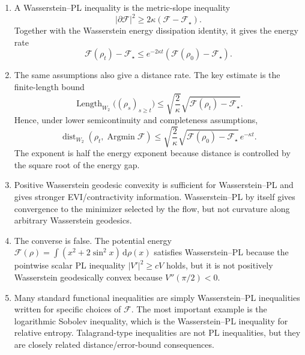 \documentclass[11pt]{article}
\theoremstyle{definition}
\newcommand{\F}{\mathcal F}
\newcommand{\W}{W_2}
\newcommand{\dd}{\,\mathrm d}
\newcommand{\distW}{\operatorname{dist}_{\W}}
\begin{document}
\begin{enumerate}[label=(\roman*)]
\item A Wasserstein--PL inequality is the metric-slope inequality
\[
        |\partial\F|^2\ge 2\kappa(\F-\F_\star).
\]
Together with the Wasserstein energy dissipation identity, it gives the energy rate
\[
        \F(\rho_t)-\F_\star\le e^{-2\kappa t}(\F(\rho_0)-\F_\star).
\]

\item The same assumptions also give a distance rate. The key estimate is the finite-length bound
\[
        \operatorname{Length}_{\W}\bigl((\rho_s)_{s\ge t}\bigr)
        \le \sqrt{\frac{2}{\kappa}}
        \sqrt{\F(\rho_t)-\F_\star}.
\]
Hence, under lower semicontinuity and completeness assumptions,
\[
        \distW(\rho_t,\operatorname{Argmin}\F)
        \le
        \sqrt{\frac{2}{\kappa}}
        \sqrt{\F(\rho_0)-\F_\star}\,e^{-\kappa t}.
\]
The exponent is half the energy exponent because distance is controlled by the square root of the energy gap.

\item Positive Wasserstein geodesic convexity is sufficient for Wasserstein--PL and gives stronger EVI/contractivity information. Wasserstein--PL by itself gives convergence to the minimizer selected by the flow, but not curvature along arbitrary Wasserstein geodesics.

\item The converse is false. The potential energy $\F(\rho)=\int (x^2+2\sin^2x)\dd\rho(x)$ satisfies Wasserstein--PL because the pointwise scalar PL inequality $|V'|^2\ge cV$ holds, but it is not positively Wasserstein geodesically convex because $V''(\pi/2)<0$.

\item Many standard functional inequalities are simply Wasserstein--PL inequalities written for specific choices of $\F$. The most important example is the logarithmic Sobolev inequality, which is the Wasserstein--PL inequality for relative entropy. Talagrand-type inequalities are not PL inequalities, but they are closely related distance/error-bound consequences.
\end{enumerate}
\end{document}
